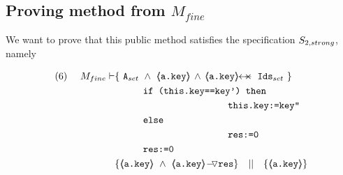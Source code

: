 \subsection{Proving method  from $M_{fine}$}
\label{s:set:sat}
 

We want to prove that this public method satisfies the specification  $S_{2,strong}$, namely

\begin{lemma}
\label{l:set:sat}
\label{l:satisfies:Mfine:pec2}
 
\begin{align*}
\text{(6)}  \ \ \ \ M_{fine} \vdash 
		&	\{  \ \Alocalsset\ \wedge\  {\inside{\prg{a.key}}} \, \wedge \, \protectedFrom {\prg{a.key}} {\Idsset}  \  \} \\
		& \SPT   \prg{if (this.key==key') then }\\
		& \SPT \SPT   \SPT\SPT  \prg{this.key:=key''} \\
	        & \SPT   \prg{else }\\
		& \SPT\SPT   \SPT\SPT  \prg{res:=0} \\
		& \SPT \prg{res:=0} \\
& \{ {\inside{\prg{a.key}}}\ \wedge\ {\PushASLong {\prg{res}} {\inside{\prg{a.key}}}}  \} \ \ \  || \ \ \ 
	   \{ {\inside{\prg{a.key}}} \}
\end{align*}

\end{lemma}

